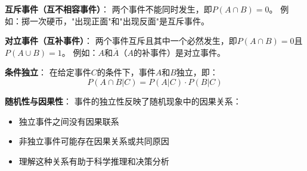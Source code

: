 \begin{examplebox}[title=事件关系的进一步分类]
\textbf{互斥事件（互不相容事件）}：
两个事件不能同时发生，即$P(A \cap B) = 0$。
例如：掷一次硬币，"出现正面"和"出现反面"是互斥事件。

\textbf{对立事件（互补事件）}：
两个事件互斥且其中一个必然发生，即$P(A \cap B) = 0$且$P(A \cup B) = 1$。
例如：$A$和$\overline{A}$（$A$的补事件）是对立事件。

\textbf{条件独立}：
在给定事件$C$的条件下，事件$A$和$B$独立，即：
$$P(A \cap B | C) = P(A|C) \cdot P(B|C)$$

\textbf{随机性与因果性}：
事件的独立性反映了随机现象中的因果关系：
\begin{itemize}
\item 独立事件之间没有因果联系
\item 非独立事件可能存在因果关系或共同原因
\item 理解这种关系有助于科学推理和决策分析
\end{itemize}
\end{examplebox}

